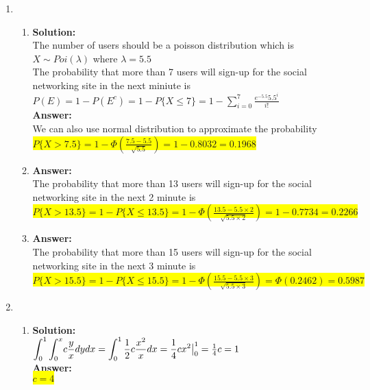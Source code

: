 \documentclass{article}
\newcommand{\myansw}{\textbf{Answer:}\\}
\newcommand{\mysolu}{\textbf{Solution:}\\}
\begin{document}
\thispagestyle{fancy} %

\begin{enumerate}
	\item
	\begin{enumerate}
		\item
		\mysolu
		The number of users should be a poisson distribution which is\\
		${X \sim Poi(\lambda)}$ where ${\lambda = 5.5}$\\
		The probability that more than 7 users will sign-up for the social networking site in the next miniute is\\
		${P(E) = 1 - P(E^c) = 1 - P\{X \leq 7\} = 1 - \sum\limits_{i = 0}^7 \frac{e^{-5.5}5.5^i}{i!}}$\\
		\myansw
		We can also use normal distribution to approximate the probability\\
		\colorbox{yellow}{${P\{X > 7.5\} = 1 - \Phi(\frac{7.5-5.5}{\sqrt{5.5}}) = 1 - 0.8032 = 0.1968 }$}\\
		
		\item
		\myansw
		The probability that more than 13 users will sign-up for the social networking site in the next 2 minute is\\
		\colorbox{yellow}{${P\{X > 13.5\} = 1 - P\{X \leq 13.5\} = 1 - \Phi(\frac{13.5 - 5.5\times2}{\sqrt{5.5 \times 2}}) = 1 - 0.7734 = 0.2266}$}\\
		
		\item
		\myansw
		The probability that more than 15 users will sign-up for the social networking site in the next 3 minute is\\
		\colorbox{yellow}{${P\{X > 15.5\} = 1 - P\{X \leq 15.5\} = 1 - \Phi(\frac{15.5 - 5.5\times3}{\sqrt{5.5 \times 3}}) = \Phi(0.2462) = 0.5987}$}\\		
		
	\end{enumerate}
	\item 
	\begin{enumerate}
		\item
		\mysolu
		${\mathlarger{\int_{0}^{1}{\int_{0}^{x}}c\frac{y}{x}dydx}=\mathlarger{\int_{0}^{1}\frac{1}{2}c\frac{x^2}{x}dx=\frac{1}{4}cx^2\big|_{0}^{1}}=\frac{1}{4}c=1}$\\
		\myansw
		\colorbox{yellow}{${c = 4}$}\\
		

\end{enumerate}
\end{enumerate}
\end{document}
